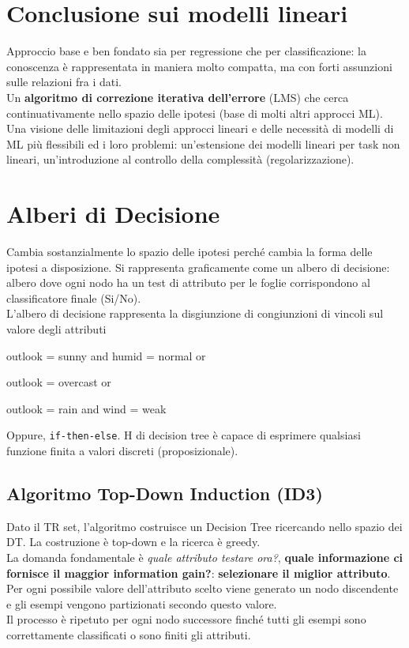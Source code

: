 \documentclass[10pt]{book}
\begin{document}
\section{Conclusione sui modelli lineari}
Approccio base e ben fondato sia per regressione che per classificazione: la conoscenza è rappresentata in maniera molto compatta, ma con forti assunzioni sulle relazioni fra i dati.\\
Un \textbf{algoritmo di correzione iterativa dell'errore} (LMS) che cerca continuativamente nello spazio delle ipotesi (base di molti altri approcci ML).\\
Una visione delle limitazioni degli approcci lineari e delle necessità di modelli di ML più flessibili ed i loro problemi: un'estensione dei modelli lineari per task non lineari, un'introduzione al controllo della complessità (regolarizzazione).
\section{Alberi di Decisione}
Cambia sostanzialmente lo spazio delle ipotesi perché cambia la forma delle ipotesi a disposizione. Si rappresenta graficamente come un albero di decisione: albero dove ogni nodo ha un test di attributo per le foglie corrispondono al classificatore finale (Si/No).\\
L'albero di decisione rappresenta la disgiunzione di congiunzioni di vincoli sul valore degli attributi
\begin{list}{}{}
	\item outlook = sunny and humid = normal or
	\item outlook = overcast or
	\item outlook = rain and wind = weak
\end{list}
Oppure, \texttt{if-then-else}. H di decision tree è capace di esprimere qualsiasi funzione finita a valori discreti (proposizionale).
\subsection{Algoritmo Top-Down Induction (ID3)}
Dato il TR set, l'algoritmo costruisce un Decision Tree ricercando nello spazio dei DT. La costruzione è top-down e la ricerca è greedy.\\
La domanda fondamentale è \textit{quale attributo testare ora?}, \textbf{quale informazione ci fornisce il maggior information gain?}: \textbf{selezionare il miglior attributo}.\\
Per ogni possibile valore dell'attributo scelto viene generato un nodo discendente e gli esempi vengono partizionati secondo questo valore.\\
Il processo è ripetuto per ogni nodo successore finché tutti gli esempi sono correttamente classificati o sono finiti gli attributi.
\end{document}
